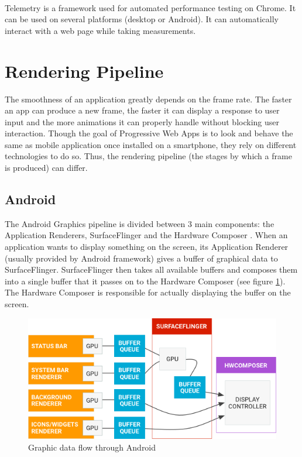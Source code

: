 \documentclass{kththesis}
\begin{document}
\paragraph{}
Telemetry \cite{telemetry} is a framework used for automated performance testing on Chrome. It can be used on several platforms (desktop or Android). It can automatically interact with a web page while taking measurements. 



\section{Rendering Pipeline}

The smoothness of an application greatly depends on the frame rate. The faster an app can produce a new frame, the faster it can display a response to user input and the more animations it can properly handle without blocking user interaction. \newline
Though the goal of Progressive Web Apps is to look and behave the same as mobile application once installed on a smartphone, they rely on different technologies to do so. Thus, the rendering pipeline (the stages by which a frame is produced) can differ.


\subsection{Android}

The Android Graphics pipeline is divided between 3 main components: the Application Renderers, SurfaceFlinger and the Hardware Composer \cite{android_graphics}.
When an application wants to display something on the screen, its Application Renderer (usually provided by Android framework) gives a buffer of graphical data to SurfaceFlinger. SurfaceFlinger then takes all available buffers and composes them into a single buffer that it passes on to the Hardware Composer (see figure \ref{fig:android_data}). The Hardware Composer is responsible for actually displaying the buffer on the screen.
\newline

\begin{figure}[!ht]
    \includegraphics[width=13cm]{kththesis/Figures/android_data_flow.png}
    \caption[Graphic data flow through Android]{Graphic data flow through Android \footnotemark}
    \label{fig:android_data}
\end{figure}
\end{document}
